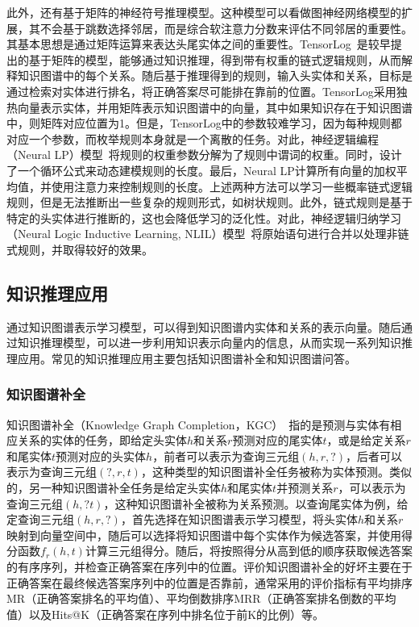 \documentclass[algorithmlist, AutoFakeBold, AutoFakeSlant, figurelist, tablelist, nomlist, masters]{seuthesix}
\begin{document}
此外，还有基于矩阵的神经符号推理模型。这种模型可以看做图神经网络模型的扩展，其不会基于跳数选择邻居，而是综合软注意力分数来评估不同邻居的重要性。其基本思想是通过矩阵运算来表达头尾实体之间的重要性。TensorLog~\cite{cohen2016tensorlog}是较早提出的基于矩阵的模型，能够通过知识推理，得到带有权重的链式逻辑规则，从而解释知识图谱中的每个关系。随后基于推理得到的规则，输入头实体和关系，目标是通过检索对实体进行排名，将正确答案尽可能排在靠前的位置。TensorLog采用独热向量表示实体，并用矩阵表示知识图谱中的向量，其中如果知识存在于知识图谱中，则矩阵对应位置为1。但是，TensorLog中的参数较难学习，因为每种规则都对应一个参数，而枚举规则本身就是一个离散的任务。对此，神经逻辑编程（Neural LP）模型~\cite{yang2017differentiable}将规则的权重参数分解为了规则中谓词的权重。同时，设计了一个循环公式来动态建模规则的长度。最后，Neural LP计算所有向量的加权平均值，并使用注意力来控制规则的长度。上述两种方法可以学习一些概率链式逻辑规则，但是无法推断出一些复杂的规则形式，如树状规则。此外，链式规则是基于特定的头实体进行推断的，这也会降低学习的泛化性。对此，神经逻辑归纳学习（Neural Logic Inductive Learning, NLIL）模型~\cite{yang2019learn}将原始语句进行合并以处理非链式规则，并取得较好的效果。

\subsection{知识推理应用}
通过知识图谱表示学习模型，可以得到知识图谱内实体和关系的表示向量。随后通过知识推理模型，可以进一步利用知识表示向量内的信息，从而实现一系列知识推理应用。常见的知识推理应用主要包括知识图谱补全和知识图谱问答。

\subsubsection{知识图谱补全}
知识图谱补全（Knowledge Graph Completion，KGC）~\cite{vu2019capsule}指的是预测与实体有相应关系的实体的任务，即给定头实体$h$和关系$r$预测对应的尾实体$t$，或是给定关系$r$和尾实体$t$预测对应的头实体$h$，前者可以表示为查询三元组$\left(h, r, ?\right)$，后者可以表示为查询三元组$\left(?, r, t\right)$，这种类型的知识图谱补全任务被称为实体预测。类似的，另一种知识图谱补全任务是给定头实体$h$和尾实体$t$并预测关系$r$，可以表示为查询三元组$\left(h, ? t\right)$，这种知识图谱补全被称为关系预测。以查询尾实体为例，给定查询三元组$\left(h, r, ?\right)$，首先选择在知识图谱表示学习模型，将头实体$h$和关系$r$映射到向量空间中，随后可以选择将知识图谱中每个实体作为候选答案，并使用得分函数$f_r\left(h, t\right)$计算三元组得分。随后，将按照得分从高到低的顺序获取候选答案的有序序列，并检查正确答案在序列中的位置。评价知识图谱补全的好坏主要在于正确答案在最终候选答案序列中的位置是否靠前，通常采用的评价指标有平均排序MR（正确答案排名的平均值）、平均倒数排序MRR（正确答案排名倒数的平均值）以及Hits@K（正确答案在序列中排名位于前K的比例）等。
\end{document}
